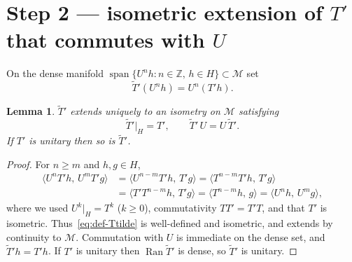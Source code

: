 \documentclass[11pt]{article}
\newtheorem{lemma}[theorem]{Lemma}
\begin{document}
\section*{Step 2 --- isometric extension of \(T'\) that commutes with \(U\)}

On the dense manifold \(\operatorname{span}\{U^n h:n\in\mathbb{Z},\,h\in H\}\subset\mathcal{M}\) set
\begin{equation}
\label{eq:def-Ttilde}
\widetilde{T}'(U^n h)=U^n(T'h).
\end{equation}

\begin{lemma}
\(\widetilde{T}'\) extends uniquely to an isometry on \(\mathcal{M}\) satisfying
\[
\widetilde{T}'\big|_H=T',
\qquad
\widetilde{T}'\,U=U\,\widetilde{T}'.
\]
If \(T'\) is unitary then so is \(\widetilde{T}'\).
\end{lemma}

\begin{proof}
For \(n\ge m\) and \(h,g\in H\),
\begin{align*}
\bigl\langle U^n T'h,\,U^m T'g\bigr\rangle
&=
\bigl\langle U^{n-m}T'h,\,T'g\bigr\rangle
=
\bigl\langle T^{n-m}T'h,\,T'g\bigr\rangle
\\
&=
\bigl\langle T'T^{n-m}h,\,T'g\bigr\rangle
=
\bigl\langle T^{n-m}h,\,g\bigr\rangle
=
\bigl\langle U^n h,\,U^m g\bigr\rangle,
\end{align*}
where we used \(U^{k}\big|_H=T^k\) (\(k\ge 0\)), commutativity \(TT'=T'T\), and that
\(T'\) is isometric. Thus~\eqref{eq:def-Ttilde} is well-defined and isometric, and
extends by continuity to \(\mathcal{M}\). Commutation with \(U\) is immediate on the dense
set, and \(\widetilde{T}'h=T'h\). If \(T'\) is unitary then
\(\operatorname{Ran}\widetilde{T}'\) is dense, so \(\widetilde{T}'\) is unitary.
\end{proof}
\end{document}

